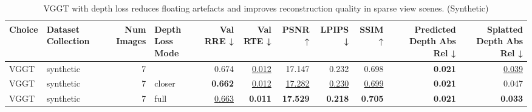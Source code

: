 \begin{table}[H]
\caption{\ifdefined\customcaption \customcaption \else VGGT with depth loss reduces floating artefacts and improves reconstruction quality in sparse view scenes. (Synthetic) \fi}
\label{tab:05_depth_loss_sparse_synthetic}
\centering
\tiny
\begin{tabular}{llrlrrrrrrr}
\toprule
Choice & Dataset Collection & Num Images & Depth Loss Mode & Val RRE ↓ & Val RTE ↓ & PSNR ↑ & LPIPS ↓ & SSIM ↑ & Predicted Depth Abs Rel ↓ & Splatted Depth Abs Rel ↓ \\
\midrule
VGGT & synthetic & 7 &  & 0.674 & \underline{0.012} & 17.147 & 0.232 & 0.698 & \textbf{0.021} & \underline{0.039} \\
VGGT & synthetic & 7 & closer & \textbf{0.662} & \underline{0.012} & \underline{17.282} & \underline{0.230} & \underline{0.699} & \textbf{0.021} & 0.047 \\
VGGT & synthetic & 7 & full & \underline{0.663} & \textbf{0.011} & \textbf{17.529} & \textbf{0.218} & \textbf{0.705} & \textbf{0.021} & \textbf{0.033} \\
\bottomrule
\end{tabular}
\end{table}